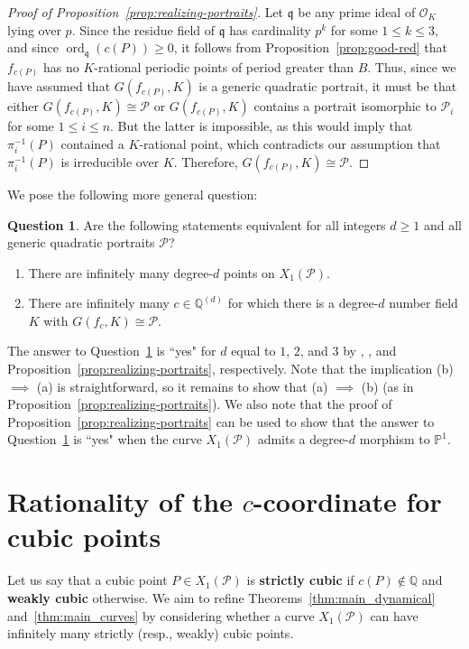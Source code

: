 \documentclass[12pt]{amsart}
\theoremstyle{definition}
\newtheorem{ques}[thm]{Question}
\newcommand{\bbP}{\mathbb{P}}
\newcommand{\bbQ}{\mathbb{Q}}
\newcommand{\calO}{\mathcal{O}}
\newcommand{\calP}{\mathcal{P}}
\newcommand{\frakq}{\mathfrak{q}}
\newcommand{\ord}{\operatorname{ord}}
\numberwithin{equation}{section}
\begin{document}
\begin{proof}[Proof of Proposition~\ref{prop:realizing-portraits}]
Let $\frakq$ be any prime ideal of $\calO_K$ lying over $p$. Since the residue field of $\frakq$ has cardinality $p^k$ for some $1 \le k \le 3$, and since $\ord_\frakq(c(P)) \ge 0$, it follows from Proposition~\ref{prop:good-red} that $f_{c(P)}$ has no $K$-rational periodic points of period greater than $B$. Thus, since we have assumed that $G(f_{c(P)}, K)$ is a generic quadratic portrait, it must be that either $G(f_{c(P)}, K) \cong \calP$ or $G(f_{c(P)}, K)$ contains a portrait isomorphic to $\calP_i$ for some $1 \le i \le n$. But the latter is impossible, as this would imply that $\pi_i^{-1}(P)$ contained a $K$-rational point, which contradicts our assumption that $\pi_i^{-1}(P)$ is irreducible over $K$. Therefore, $G(f_{c(P)}, K) \cong \calP$.
\end{proof}

We pose the following more general question:

\begin{ques}\label{ques:degree-d-points}
Are the following statements equivalent for all integers $d \ge 1$ and all generic quadratic portraits $\calP$?
    \begin{enumerate}
        \item There are infinitely many degree-$d$ points on $X_1(\calP)$.
        \item There are infinitely many $c \in \bbQ^{(d)}$ for which there is a degree-$d$ number field $K$ with $G(f_c,K) \cong \calP$.
    \end{enumerate}
\end{ques}

The answer to Question~\ref{ques:degree-d-points} is ``yes" for $d$ equal to $1$, $2$, and $3$ by \cite[Theorem 4.1]{faber:2015}, \cite[Theorem 1.5]{doyle/krumm:2024}, and Proposition~\ref{prop:realizing-portraits}, respectively. Note that the implication (b) $\implies$ (a) is straightforward, so it remains to show that (a) $\implies$ (b) (as in Proposition~\ref{prop:realizing-portraits}).
We also note that the proof of Proposition~\ref{prop:realizing-portraits} can be used to show that the answer to Question~\ref{ques:degree-d-points} is ``yes" when the curve $X_1(\calP)$ admits a degree-$d$ morphism to $\bbP^1$. 

\section{Rationality of the $c$-coordinate for cubic points}\label{sec:FOD}
Let us say that a cubic point $P \in X_1(\calP)$ is {\bf strictly cubic} if $c(P) \notin \bbQ$ and {\bf weakly cubic} otherwise. We aim to refine Theorems~\ref{thm:main_dynamical} and~\ref{thm:main_curves} by considering whether a curve $X_1(\calP)$ can have infinitely many strictly (resp., weakly) cubic points.
\end{document}
